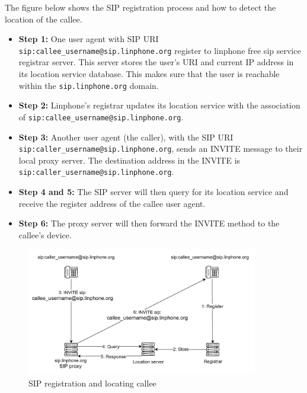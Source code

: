     \noindent The figure below shows the SIP registration process and how to detect the location of the callee. 
    \sloppy
    \begin{itemize}
        \item \textbf {Step 1:} One user agent with SIP URI \texttt{sip:callee\_username@sip.linphone.org} register to linphone free sip service registrar server. 
        This server stores the user’s URI and current IP address in its location service database. 
        This makes sure that the user is reachable within the \texttt{sip.linphone.org} domain. 
        \item \textbf {Step 2:} Linphone’s registrar updates its location service with the association of \texttt{sip:\allowbreak callee\_username@sip.linphone.org}.
        \item \textbf {Step 3:} Another user agent (the caller), with the SIP URI \texttt{\allowbreak sip:caller\_username\allowbreak @sip.linphone.org}, 
        sends an INVITE message to their local proxy server. 
        The destination address in the INVITE is \texttt{sip:caller\_username@sip.linphone.org}.
        \item \textbf {Step 4 and 5:} The SIP server will then query for its location service and receive the register address of the callee user agent.
        \item \textbf {Step 6:} The proxy server will then forward the INVITE method to the callee’s device. 
    \end{itemize}

    \begin{figure}[H]
        \centering
        \includegraphics[width=0.9\textwidth, height=0.4\textheight]{image/Locating_callee.png} 
        \caption{SIP registration and locating callee}
        \label{fig:locating_callee}
    \end{figure}

